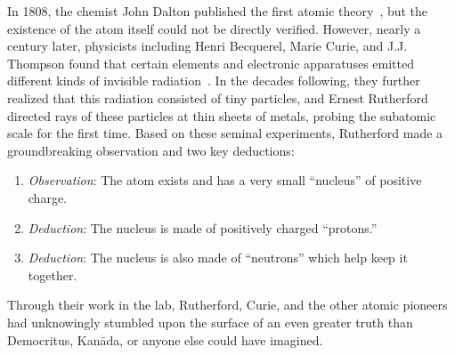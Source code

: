 \begin{dissertationintroduction}
In 1808, the chemist John Dalton published the first\footnotemark{} atomic theory~\cite{Dalton1805, Dalton1808}, but the existence of the atom itself could not be directly verified. 
However, nearly a century later, physicists including Henri Becquerel, Marie Curie, and J.J. Thompson found that certain elements and electronic apparatuses emitted different kinds of invisible radiation~\cite{Becquerel, Curie, RADVANYI2017544, Thompson}. 
In the decades following, they further realized that this radiation consisted of tiny particles\footnotemark{}, and Ernest Rutherford directed rays of these particles at thin sheets of metals, probing the subatomic scale for the first time. 
Based on these seminal experiments, Rutherford made a groundbreaking observation and two key deductions: %
\begin{enumerate}
    \item \textit{Observation}: The atom exists\footnotemark{} and has a very small ``nucleus'' of positive charge.
    \item \textit{Deduction}: The nucleus is made of positively charged ``protons.''
    \item \textit{Deduction}: The nucleus is also made of ``neutrons'' which help keep it together.
\end{enumerate}
Through their work in the lab, Rutherford, Curie, and the other atomic pioneers had unknowingly stumbled upon the surface of an even greater truth than Democritus, Kan\=ada, or anyone else could have imagined. 


\end{dissertationintroduction}
